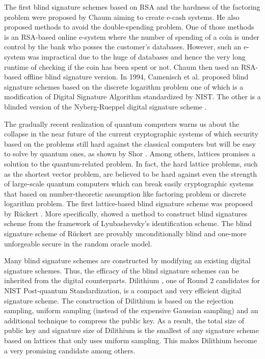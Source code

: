 \documentclass[conference]{IEEEtran}
\begin{document}
	
	The first blind signature schemes based on RSA and the
	hardness of the factoring problem were proposed by Chaum \cite{Chau83,Chau84, Chau88} aiming to create e-cash systems. He also proposed methods to avoid the double-spending problem. One of those methods is an
	RSA-based online e-system where the number of spending of a coin is under control by the bank who posses the customer's databases. However, such an e-system was impractical due to the huge of databases and hence the very long runtime of checking if the coin has been spent or not. Chaum then used an RSA-based offline blind signature version. In 1994, Camenisch et al.  \cite{Cam95} proposed blind signature schemes based on the discrete logarithm problem one of which is a modification of Digital Signature Algorithm standardized by NIST. The other is a blinded version of the Nyberg-Rueppel digital signature scheme \cite{Nyberg93}. 
	
	The gradually recent realization of quantum computers warns us about the collapse in the near future of the current cryptographic systems of which security based on the problems still hard against the classical computers but will be easy to solve by quantum ones, as shown by Shor \cite{Shor97}. Among others, lattices promises a solution to the quantum-related problem. In fact, the hard lattice problems, such as the shortest
	vector problem, are believed to be hard against even the strength of large-scale quantum computers which can break easily cryptographic systems that based on number-theoretic assumption like factoring problem or discrete logarithm problem.  The first lattice-based blind signature scheme was proposed by R{\"u}ckert \cite{Ruc10}. More specifically,  \cite{Ruc10} showed a method to  construct blind signatures scheme from the framework of Lyubashevsky’s identification scheme. The blind signature scheme of R{\"u}ckert are provably unconditionally blind and one-more unforgeable secure in the random oracle model. 


Many blind signature schemes are constructed by modifying an existing digital signature schemes. Thus, the efficacy of the blind signature schemes can be inherited from the digital counterparts. \textsf{Dilithium} \cite{DLL+17, DKL+19}, one of Round 2 candidates for NIST Post-quantum Standardization, is a compact and very efficient digital signature scheme. The construction of \textsf{Dilithium} is based on the rejection sampling, uniform sampling (instead of the expensive Gaussian sampling) and an additional technique to compress the public key. As a result, the total size of public key and signature size of  \textsf{Dilithium} is  the smallest of any signature scheme based on lattices that only uses uniform sampling. This makes \textsf{Dilithium} become a very promising candidate among others.
\end{document}
